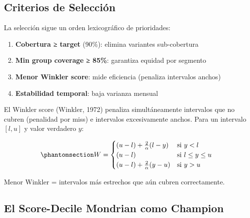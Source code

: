 \documentclass[
  spanish,
  11pt,
  letterpaper,
]{scrbook}
\providecommand{\tightlist}{%
  \setlength{\itemsep}{0pt}\setlength{\parskip}{0pt}}
\theoremstyle{plain}
\theoremstyle{remark}
\begin{document}
\subsection{Criterios de Selección}\label{criterios-de-selecciuxf3n-1}

La selección sigue un orden lexicográfico de prioridades:

\begin{enumerate}
\def\labelenumi{\arabic{enumi}.}
\tightlist
\item
  \textbf{Cobertura ≥ target} (90\%): elimina variantes sub-cobertura
\item
  \textbf{Min group coverage ≥ 85\%}: garantiza equidad por segmento
\item
  \textbf{Menor Winkler score}: mide eficiencia (penaliza intervalos
  anchos)
\item
  \textbf{Estabilidad temporal}: baja varianza mensual
\end{enumerate}

\begin{tcolorbox}[enhanced jigsaw, arc=.35mm, bottomrule=.15mm, bottomtitle=1mm, breakable, colback=white, colbacktitle=quarto-callout-note-color!10!white, colframe=quarto-callout-note-color-frame, coltitle=black, left=2mm, leftrule=.75mm, opacityback=0, opacitybacktitle=0.6, rightrule=.15mm, title=\textcolor{quarto-callout-note-color}{\faInfo}\hspace{0.5em}{Winkler Score}, titlerule=0mm, toprule=.15mm, toptitle=1mm]

El Winkler score (Winkler, 1972) penaliza simultáneamente intervalos que
no cubren (penalidad por miss) e intervalos excesivamente anchos. Para
un intervalo \([l, u]\) y valor verdadero \(y\):

\begin{equation}\protect\phantomsection\label{eq-winkler}{
W = \begin{cases}
(u - l) + \frac{2}{\alpha}(l - y) & \text{si } y < l \\
(u - l) & \text{si } l \leq y \leq u \\
(u - l) + \frac{2}{\alpha}(y - u) & \text{si } y > u
\end{cases}
}\end{equation}

Menor Winkler = intervalos más estrechos que aún cubren correctamente.

\end{tcolorbox}

\subsection{El Score-Decile Mondrian como
Champion}\label{el-score-decile-mondrian-como-champion}
\end{document}
